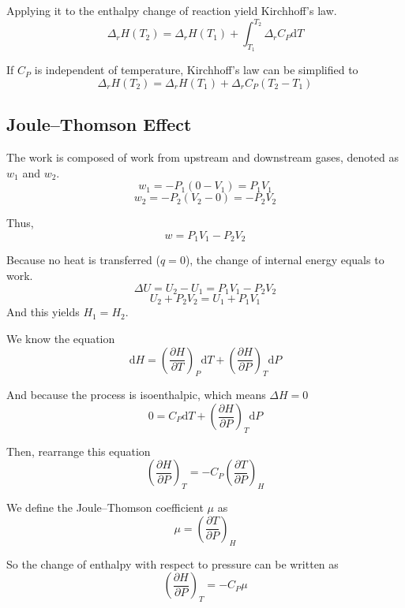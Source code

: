 \documentclass[letterpaper]{article}
\newcommand{\diff}{\mathrm{d}}
\begin{document}
Applying it to the enthalpy change of reaction yield Kirchhoff’s law.
\begin{equation*}
    \Delta_rH(T_2)=\Delta_rH(T_1)+\int_{T_1}^{T_2}\Delta_rC_P\diff T
\end{equation*}

If $C_P$ is independent of temperature, Kirchhoff’s law can be simplified to
\begin{equation*}
    \Delta_rH(T_2)=\Delta_rH(T_1)+\Delta_rC_P(T_2-T_1)
\end{equation*}
\subsection*{Joule–Thomson Effect}
The work is composed of work from upstream and downstream gases, denoted as $w_1$ and $w_2$.
\begin{equation*}
    w_1=-P_1(0-V_1)=P_1V_1
\end{equation*}
\begin{equation*}
    w_2=-P_2(V_2-0)=-P_2V_2
\end{equation*}

Thus,
\begin{equation*}
    w=P_1V_1-P_2V_2
\end{equation*}

Because no heat is transferred ($q=0$), the change of internal energy equals to work.
\begin{equation*}
    \Delta U=U_2-U_1=P_1V_1-P_2V_2
\end{equation*}
\begin{equation*}
    U_2+P_2V_2=U_1+P_1V_1
\end{equation*}
And this yields $H_1=H_2$.

We know the equation
\begin{equation*}
    \diff H=(\frac{\partial H}{\partial T})_P\diff T+(\frac{\partial H}{\partial P})_T\diff P
\end{equation*}

And because the process is isoenthalpic, which means $\Delta H=0$
\begin{equation*}
    0=C_P\diff T+(\frac{\partial H}{\partial P})_T\diff P
\end{equation*}

Then, rearrange this equation
\begin{equation*}
    (\frac{\partial H}{\partial P})_T=-C_P(\frac{\partial T}{\partial P})_H
\end{equation*}

We define the Joule–Thomson coefficient $\mu$ as
\begin{equation*}
    \mu=(\frac{\partial T}{\partial P})_H
\end{equation*}

So the change of enthalpy with respect to pressure can be written as
\begin{equation*}
    \boxed{(\frac{\partial H}{\partial P})_T=-C_P\mu}
\end{equation*}
\end{document}
